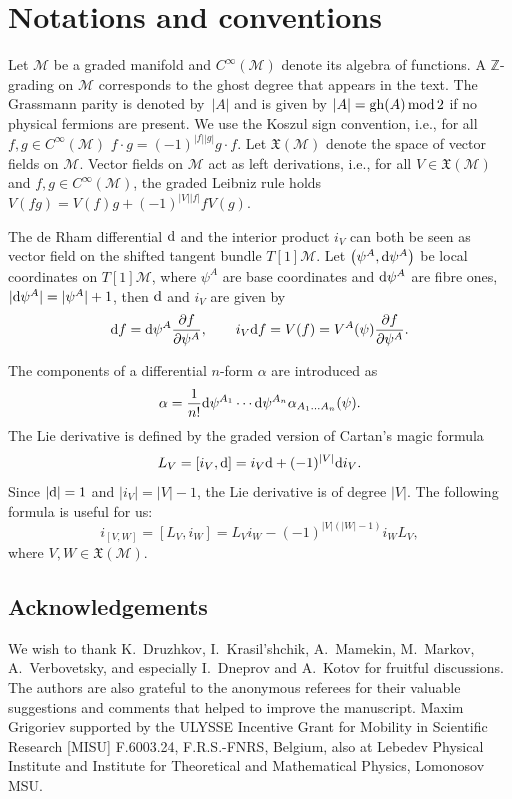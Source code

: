 \documentclass[10pt,a4paper]{amsart}
\numberwithin{equation}{section}
\theoremstyle{definition}
\renewcommand{\mod}{\,\rm mod \,}
\newcommand{\p}[1]{|#1|}
\newcommand{\gh}[1]{\mathrm{gh}(#1)}
\begin{document}
\appendix
\section{Notations and conventions}
Let $\mathcal{M}$ be a graded manifold and $C^{\infty}(\mathcal{M})$ denote its algebra of functions. A $\mathbb{Z}$-grading on $\mathcal{M}$ corresponds to the ghost degree that appears in the text. The Grassmann parity is denoted by~$\p{A}$ and is given by $\p{A}=\gh{A}\mod 2$ if no physical fermions are present. We use the Koszul sign convention, i.e., for all $f,g\in C^{\infty}(\mathcal{M})$ $f\cdot g=(-1)^{|f||g|}g\cdot f$. Let $\mathfrak{X}(\mathcal{M})$ denote the space of vector fields on $\mathcal{M}$. Vector fields on $\mathcal{M}$ act as left derivations, i.e., for all $V\in \mathfrak{X}(\mathcal{M})$ and $f,g\in C^{\infty}(\mathcal{M})$, the graded Leibniz rule holds $V(fg)=V(f)g+(-1)^{|V||f|}fV(g)$.

The de Rham differential ${\rm d}$ and the interior product $i_V$ can both be seen as vector field on the shifted tangent bundle $T[1]\mathcal{M}$. Let $\bigl(\psi^A,{\rm d}\psi^A\bigr)$ be local coordinates on $T[1]\mathcal{M}$, where $\psi^A$ are base coordinates and ${\rm d}\psi^A$ are fibre ones, $\p{{\rm d}\psi^A}=\p{\psi^A}+1$, then ${\rm d}$ and $i_V$ are given by
\begin{equation*}
 {\rm d}f={\rm d}\psi^A\frac{\partial f}{\partial \psi^A},\qquad i_V{\rm d}f=V(f)=V^A(\psi)\frac{\partial f}{\partial \psi^A}.
\end{equation*}

The components of a differential $n$-form $\alpha$ are introduced as
\begin{equation*}
 \alpha=\frac{1}{n!}{\rm d}\psi^{A_1}\cdots {\rm d}\psi^{A_n}\alpha_{A_1\dots A_n}(\psi).
\end{equation*}
The Lie derivative is defined by the graded version of Cartan's magic formula
\begin{equation*}
 L_V=[i_V,{\rm d}]=i_V{\rm d}+(-1)^{|V|}{\rm d}i_V.
\end{equation*}
Since $|{\rm d}|=1$ and $|i_V|=|V|-1$, the Lie derivative is of degree $|V|$. The following formula is useful for us:{\samepage
\begin{equation*}
 i_{[V,W]}=[L_{V},i_{W}]=L_{V}i_{W}-(-1)^{|V|(|W|-1)}i_{W}L_{V},
\end{equation*}
where $V,W\in \mathfrak{X}(\mathcal{M})$.}


\subsection*{Acknowledgements}
We wish to thank K.~Druzhkov, I.~Krasil'shchik, A.~Mamekin, M.~Markov, A.~Verbovetsky, and especially I.~Dneprov and A.~Kotov for fruitful discussions. The authors are also grateful to the anonymous referees for their valuable suggestions and comments that helped to improve the manuscript.
Maxim Grigoriev supported by the ULYSSE Incentive
Grant for Mobility in Scientific Research [MISU] F.6003.24, F.R.S.-FNRS, Belgium, also at Lebedev Physical Institute and Institute for Theoretical and Mathematical Physics, Lomonosov MSU.
\end{document}
